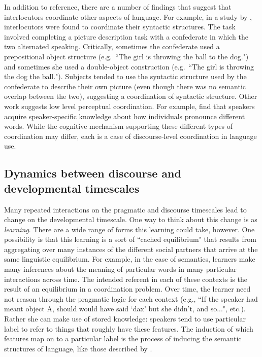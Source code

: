 \documentclass[man, noapacite, 12pt]{apa2}
\begin{document}
In addition to reference, there are a number of findings that suggest that interlocutors coordinate other aspects of language.  For example, in a study by , interlocutors were found to coordinate their syntactic structures. The task involved completing a picture description task with a confederate in which the two alternated speaking. Critically,  sometimes the confederate used a prepositional object structure (e.g.\ ``The girl is throwing the ball to the dog.") and sometimes she used a double-object construction (e.g.\ ``The girl is throwing the dog the ball.").  Subjects tended to use the syntactic structure used by the confederate to describe their own picture (even though there was no semantic overlap between the two), suggesting a coordination of syntactic structure. Other work suggests low level perceptual coordination. For example,   find that speakers acquire speaker-specific knowledge about how individuals pronounce different words. While the cognitive mechanism supporting these different types of coordination may differ,  each is a case of discourse-level coordination in language use. 

\subsection{Dynamics between discourse and developmental timescales} 
Many repeated interactions on the pragmatic and discourse timescales lead to change on the developmental timescale. One way to think about this change is as {\it learning}. There are a wide range of forms this learning could take, however. One possibility is that this learning is a sort of ``cached equilibrium" that results from aggregating over many instances of the different social partners that arrive at the same linguistic equilibrium. For example, in the case of semantics, learners make many inferences about the meaning of particular words in many particular interactions across time. The intended referent in each of these contexts is the result of an equilibrium in a coordination problem. Over time, the learner need not reason through the pragmatic logic for each context (e.g., ``If the speaker had meant object A, should would have said `dax' but she didn't, and so...", etc.). Rather she can make use of stored knowledge: speakers tend to use particular label to refer to things that roughly have these features. The induction of which features map on to a particular label is the process of inducing the semantic structures of language, like those described by .
\end{document}
